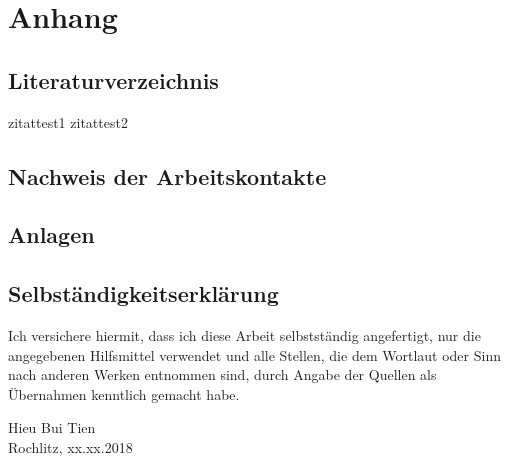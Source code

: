 \chapter{Anhang}


\section{Literaturverzeichnis}

zitattest1 \cite[S.123]{Theis.2017}
zitattest2 \cite[S.321]{Theis.2017}

\section{Nachweis der Arbeitskontakte}

\section{Anlagen}


\section{Selbständigkeitserklärung}
\begin{normalsize}
Ich versichere hiermit, dass ich diese Arbeit selbstständig angefertigt, nur die angegebenen Hilfsmittel verwendet und alle Stellen, die dem Wortlaut oder Sinn nach anderen Werken entnommen sind, durch Angabe der Quellen als Übernahmen kenntlich gemacht habe.
\end{normalsize}

\vspace{3,5cm}


\begin{flushleft}
Hieu Bui Tien \\
Rochlitz, xx.xx.2018
\end{flushleft}






